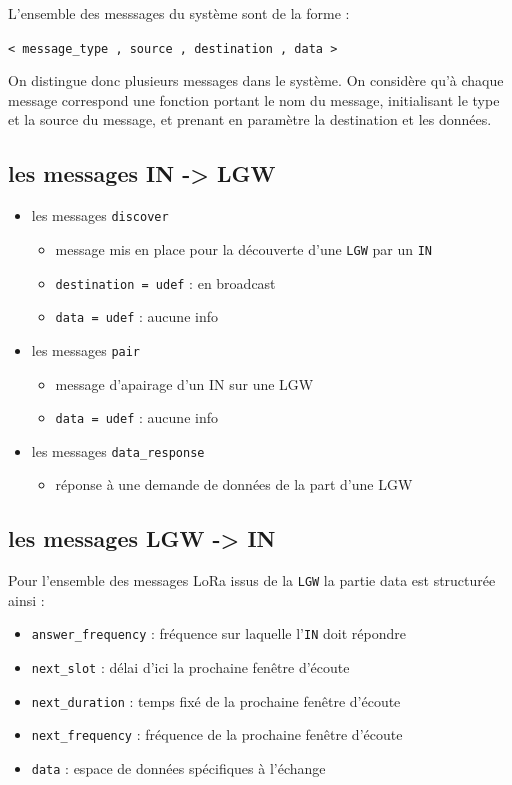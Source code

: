 L'ensemble des messsages du système sont de la forme :

\begin{center}
\texttt{< message\_type , source , destination , data >}
\end{center}

On distingue donc plusieurs messages dans le système. On considère qu'à chaque message correspond une fonction portant le nom du message, initialisant le type et la source du message, et prenant en paramètre la destination et les données.

\subsection{les messages IN -> LGW}
\begin{itemize}
    \item les messages \texttt{discover}
    \begin{itemize}
      \item message mis en place pour la découverte d'une \texttt{LGW} par un \texttt{IN}
      \item \texttt{destination = udef} : en broadcast
      \item \texttt{data = udef} : aucune info
    \end{itemize}
    \item les messages \texttt{pair}
    \begin{itemize}
      \item message d'apairage d'un IN sur une LGW
      \item \texttt{data = udef} : aucune info
    \end{itemize}
    \item les messages \texttt{data\_response}
    \begin{itemize}
      \item réponse à une demande de données de la part d'une LGW
    \end{itemize}
\end{itemize}

\subsection{les messages LGW -> IN}
Pour l'ensemble des messages LoRa issus de la \texttt{LGW} la partie data est structurée ainsi :

\begin{itemize}
  \item \texttt{answer\_frequency} : fréquence sur laquelle l'\texttt{IN} doit répondre
  \item \texttt{next\_slot} : délai d'ici la prochaine fenêtre d'écoute
  \item \texttt{next\_duration} : temps fixé de la prochaine fenêtre d'écoute
  \item \texttt{next\_frequency} : fréquence de la prochaine fenêtre d'écoute
  \item \texttt{data} : espace de données spécifiques à l'échange
\end{itemize}


